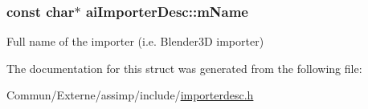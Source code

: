 \subsubsection[{\texorpdfstring{m\+Name}{mName}}]{\setlength{\rightskip}{0pt plus 5cm}const char$\ast$ ai\+Importer\+Desc\+::m\+Name}\hypertarget{structai_importer_desc_a2a9d5fd818c01bba1a0a782722ab9495}{}\label{structai_importer_desc_a2a9d5fd818c01bba1a0a782722ab9495}
Full name of the importer (i.\+e. Blender3D importer) 

The documentation for this struct was generated from the following file\+:\begin{DoxyCompactItemize}
\item 
Commun/\+Externe/assimp/include/\hyperlink{importerdesc_8h}{importerdesc.\+h}\end{DoxyCompactItemize}
